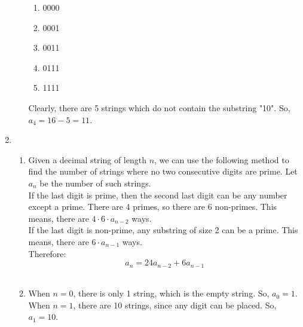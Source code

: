 \documentclass[a4paper]{article}
\begin{document}
\begin{enumerate}
\begin{enumerate}
            \begin{enumerate}
                \item 0000
                \item 0001
                \item 0011
                \item 0111
                \item 1111
            \end{enumerate}
            
            Clearly, there are 5 strings which do not contain the substring "10". So, $a_4 = 16 - 5 = 11$.

        \end{enumerate}

        \newpage
        \item \begin{enumerate}
            \item Given a decimal string of length $n$, we can use the following method to find the number of strings where no two consecutive digits are prime. Let $a_n$ be the number of such strings. \\
            
            If the last digit is prime, then the second last digit can be any number except a prime. There are 4 primes, so there are 6 non-primes. This means, there are $4 \cdot 6 \cdot a_{n-2}$ ways. \\

            If the last digit is non-prime, any substring of size 2 can be a prime. This means, there are $6 \cdot a_{n-1}$ ways. \\

            Therefore:
            \[ a_n = 24a_{n-2} + 6a_{n-1} \] \\

            \item When $n = 0$, there is only 1 string, which is the empty string. So, $a_0 = 1$. \\
            When $n = 1$, there are 10 strings, since any digit can be placed. So, $a_1 = 10$. \\


\end{enumerate}
\end{enumerate}
\end{document}

